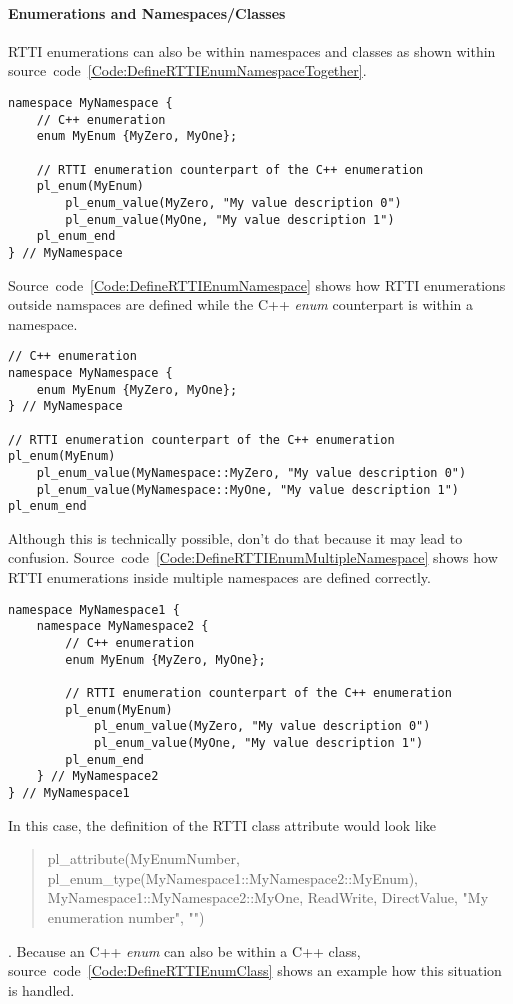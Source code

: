 \paragraph{Enumerations and Namespaces/Classes}
RTTI enumerations can also be within namespaces and classes as shown within source~code~\ref{Code:DefineRTTIEnumNamespaceTogether}.
\begin{lstlisting}[float=htb,label=Code:DefineRTTIEnumNamespaceTogether,caption={Defining a new RTTI enumeration within a namespace}]
namespace MyNamespace {
	// C++ enumeration
	enum MyEnum {MyZero, MyOne};

	// RTTI enumeration counterpart of the C++ enumeration
	pl_enum(MyEnum)
		pl_enum_value(MyZero, "My value description 0")
		pl_enum_value(MyOne, "My value description 1")
	pl_enum_end
} // MyNamespace
\end{lstlisting}
Source~code~\ref{Code:DefineRTTIEnumNamespace} shows how RTTI enumerations outside namspaces are defined while the C++ \emph{enum} counterpart is within a namespace.
\begin{lstlisting}[float=htb,label=Code:DefineRTTIEnumNamespace,caption={Defining a new RTTI enumeration with ugly mixed namespaces}]
// C++ enumeration
namespace MyNamespace {
	enum MyEnum {MyZero, MyOne};
} // MyNamespace

// RTTI enumeration counterpart of the C++ enumeration
pl_enum(MyEnum)
	pl_enum_value(MyNamespace::MyZero, "My value description 0")
	pl_enum_value(MyNamespace::MyOne, "My value description 1")
pl_enum_end
\end{lstlisting}
Although this is technically possible, don't do that because it may lead to confusion. Source~code~\ref{Code:DefineRTTIEnumMultipleNamespace} shows how RTTI enumerations inside multiple namespaces are defined correctly.
\begin{lstlisting}[label=Code:DefineRTTIEnumMultipleNamespace,caption={Defining a new RTTI enumeration within multiple namespaces}]
namespace MyNamespace1 {
	namespace MyNamespace2 {
		// C++ enumeration
		enum MyEnum {MyZero, MyOne};

		// RTTI enumeration counterpart of the C++ enumeration
		pl_enum(MyEnum)
			pl_enum_value(MyZero, "My value description 0")
			pl_enum_value(MyOne, "My value description 1")
		pl_enum_end
	} // MyNamespace2
} // MyNamespace1
\end{lstlisting}
In this case, the definition of the RTTI class attribute would look like \begin{quote}pl\_attribute(MyEnumNumber, pl\_enum\_type(MyNamespace1::MyNamespace2::MyEnum), MyNamespace1::MyNamespace2::MyOne, ReadWrite, DirectValue, "My enumeration number", "")\end{quote}. Because an C++ \emph{enum} can also be within a C++ class, source~code~\ref{Code:DefineRTTIEnumClass} shows an example how this situation is handled.
